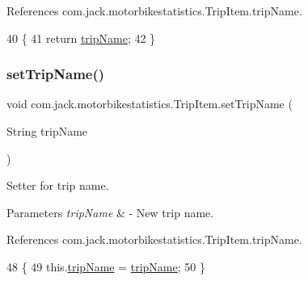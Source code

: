 References com.\+jack.\+motorbikestatistics.\+Trip\+Item.\+trip\+Name.


\begin{DoxyCode}
40                                 \{
41         \textcolor{keywordflow}{return} \hyperlink{classcom_1_1jack_1_1motorbikestatistics_1_1_trip_item_a2e678c328ae2972516c2da9d21826359}{tripName};
42     \}
\end{DoxyCode}
\mbox{\label{classcom_1_1jack_1_1motorbikestatistics_1_1_trip_item_a359fbbbde7fde3af75379054c87cfb2d}} 
\subsubsection{\texorpdfstring{set\+Trip\+Name()}{setTripName()}}
{\footnotesize\ttfamily void com.\+jack.\+motorbikestatistics.\+Trip\+Item.\+set\+Trip\+Name (\begin{DoxyParamCaption}\item[{String}]{trip\+Name }\end{DoxyParamCaption})\hspace{0.3cm}{\ttfamily [inline]}}



Setter for trip name. 


\begin{DoxyParams}{Parameters}
{\em trip\+Name} & -\/ New trip name. \\
\hline
\end{DoxyParams}


References com.\+jack.\+motorbikestatistics.\+Trip\+Item.\+trip\+Name.


\begin{DoxyCode}
48                                              \{
49         this.\hyperlink{classcom_1_1jack_1_1motorbikestatistics_1_1_trip_item_a2e678c328ae2972516c2da9d21826359}{tripName} = \hyperlink{classcom_1_1jack_1_1motorbikestatistics_1_1_trip_item_a2e678c328ae2972516c2da9d21826359}{tripName};
50     \}
\end{DoxyCode}
\mbox{\label{classcom_1_1jack_1_1motorbikestatistics_1_1_trip_item_aec0e07444e68e4492daa734bf3d6e24a}} 
